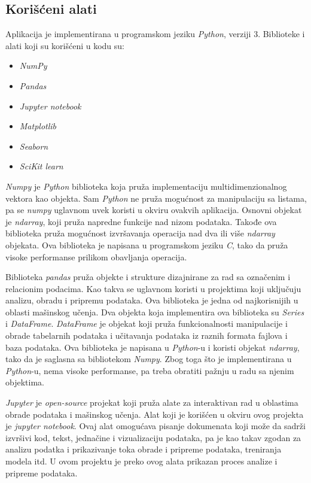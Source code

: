 \documentclass[a4paper,12pt,titlepage]{article}
\begin{document}
\subsection{Korišćeni alati}

Aplikacija je implementirana u programskom jeziku \emph{Python}, verziji 3. Biblioteke i alati koji su korišćeni u kodu su:

\begin{itemize}
\item \emph{NumPy} \cite{NumPy}
\item \emph{Pandas} \cite{Pandas}
\item \emph{Jupyter notebook} \cite{Jupyter}
\item \emph{Matplotlib} \cite{Matplotlib}
\item \emph{Seaborn} \cite{Seaborn}
\item \emph{SciKit learn} \cite{Scikit}
\end{itemize}

\emph{Numpy} je \emph{Python} biblioteka koja pruža implementaciju multidimenzionalnog vektora kao objekta. Sam \emph{Python} ne pruža mogućnost za manipulaciju sa listama, pa se \emph{numpy} uglavnom uvek koristi u okviru ovakvih aplikacija. Osnovni objekat je \emph{ndarray}, koji pruža napredne funkcije nad nizom podataka. Takođe ova biblioteka pruža mogućnost izvršavanja operacija nad dva ili više \emph{ndarray} objekata. Ova biblioteka je napisana u programskom jeziku \emph{C}, tako da pruža visoke performanse prilikom obavljanja operacija.

Biblioteka \emph{pandas} pruža objekte i strukture dizajnirane za rad sa označenim i relacionim podacima. Kao takva se uglavnom koristi u projektima koji uključuju analizu, obradu i pripremu podataka. Ova biblioteka je jedna od najkorisnijih u oblasti mašinskog učenja. Dva objekta koja implementira ova biblioteka su \emph{Series} i \emph{DataFrame}. \emph{DataFrame} je objekat koji pruža funkcionalnosti manipulacije i obrade tabelarnih podataka i učitavanja podataka iz raznih formata fajlova i baza podataka. Ova biblioteka je napisana u \emph{Python}-u i koristi objekat \emph{ndarray}, tako da je saglasna sa bibliotekom \emph{Numpy}. Zbog toga što je implementirana u \emph{Python}-u, nema visoke performanse, pa treba obratiti pažnju u radu sa njenim objektima.

\emph{Jupyter} je \emph{open-source} projekat koji pruža alate za interaktivan rad u oblastima obrade podataka i mašinskog učenja. Alat koji je korišćen u okviru ovog projekta je \emph{jupyter notebook}. Ovaj alat omogućava pisanje dokumenata koji može da sadrži izvršivi kod, tekst, jednačine i vizualizaciju podataka, pa je kao takav zgodan za analizu podatka i prikazivanje toka obrade i pripreme podataka, treniranja modela itd. U ovom projektu je preko ovog alata prikazan proces analize i pripreme podataka.
\end{document}
